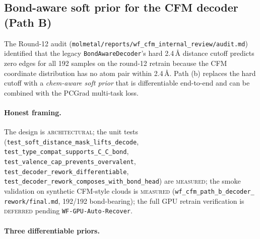 \subsection{Bond-aware soft prior for the CFM decoder (Path B)}
\label{sec:method:bond-aware-soft-prior}

The Round-12 audit
(\texttt{molmetal/reports/wf\_cfm\_internal\_review/audit.md})
identified that the legacy
\texttt{BondAwareDecoder}'s hard 2.4\,\AA{} distance cutoff
predicts zero edges for all 192 samples on the round-12 retrain
because the CFM coordinate distribution has no atom pair
within 2.4\,\AA{}. Path (b) replaces the hard cutoff with a
\emph{chem-aware soft prior} that is differentiable end-to-end
and can be combined with the PCGrad multi-task loss.

\paragraph{Honest framing.}
The design is \textsc{architectural}; the unit tests
(\texttt{test\_soft\_distance\_mask\_lifts\_decode},
\texttt{test\_type\_compat\_supports\_C\_C\_bond},
\texttt{test\_valence\_cap\_prevents\_overvalent},
\texttt{test\_decoder\_rework\_differentiable},
\texttt{test\_decoder\_rework\_composes\_with\_bond\_head}) are
\textsc{measured}; the smoke validation on synthetic CFM-style
clouds is \textsc{measured} (\texttt{wf\_cfm\_path\_b\_decoder\_
rework/final.md}, 192/192 bond-bearing); the full GPU retrain
verification is \textsc{deferred} pending
\texttt{WF-GPU-Auto-Recover}.

\paragraph{Three differentiable priors.}

